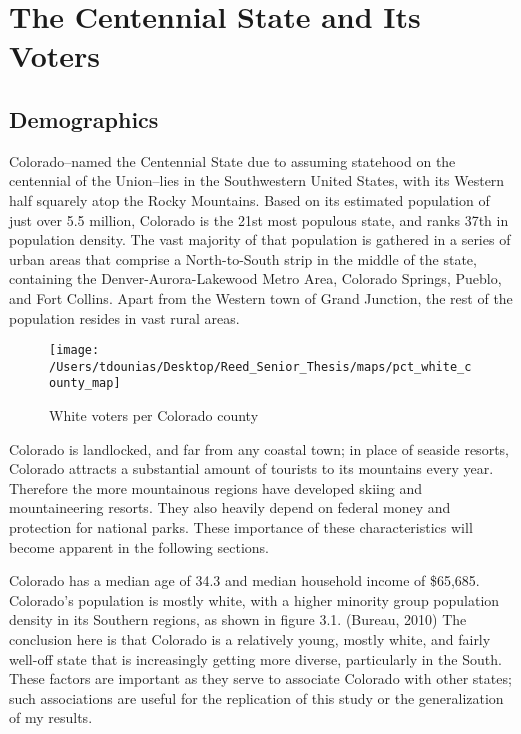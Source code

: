 \documentclass[12pt,twoside]{reedthesis}
\begin{document}
  \section{The Centennial State and Its
  Voters}\label{the-centennial-state-and-its-voters}
  
  \subsection{Demographics}\label{demographics}
  
  Colorado--named the Centennial State due to assuming statehood on the
  centennial of the Union--lies in the Southwestern United States, with
  its Western half squarely atop the Rocky Mountains. Based on its
  estimated population of just over 5.5 million, Colorado is the 21st most
  populous state, and ranks 37th in population density. The vast majority
  of that population is gathered in a series of urban areas that comprise
  a North-to-South strip in the middle of the state, containing the
  Denver-Aurora-Lakewood Metro Area, Colorado Springs, Pueblo, and Fort
  Collins. Apart from the Western town of Grand Junction, the rest of the
  population resides in vast rural areas.
  
  \begin{figure}
  
  {\centering \texttt{[image: /Users/tdounias/Desktop/Reed\_Senior\_Thesis/maps/pct\_white\_county\_map]} 
  
  }
  
  \caption[White voters per Colorado county]{White voters per Colorado county}\label{fig:white pct map}
  \end{figure}
  
  Colorado is landlocked, and far from any coastal town; in place of
  seaside resorts, Colorado attracts a substantial amount of tourists to
  its mountains every year. Therefore the more mountainous regions have
  developed skiing and mountaineering resorts. They also heavily depend on
  federal money and protection for national parks. These importance of
  these characteristics will become apparent in the following sections.
  
  Colorado has a median age of 34.3 and median household income of
  \$65,685. Colorado's population is mostly white, with a higher minority
  group population density in its Southern regions, as shown in figure
  3.1. (Bureau, 2010) The conclusion here is that Colorado is a relatively
  young, mostly white, and fairly well-off state that is increasingly
  getting more diverse, particularly in the South. These factors are
  important as they serve to associate Colorado with other states; such
  associations are useful for the replication of this study or the
  generalization of my results.
  
\end{document}
